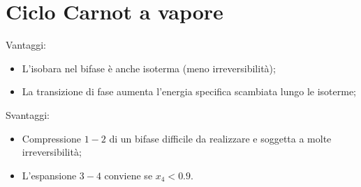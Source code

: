 \section{Ciclo Carnot a vapore}

Vantaggi:
\begin{itemize}
    \item L'isobara nel bifase è anche isoterma (meno irreversibilità);
    \item La transizione di fase aumenta l'energia specifica scambiata lungo le isoterme;
\end{itemize}

Svantaggi:
\begin{itemize}
    \item Compressione $1-2$ di un bifase difficile da realizzare e soggetta a molte irreversibilità;
    \item L'espansione $3-4$ conviene se $x_4<0.9$.
\end{itemize}

